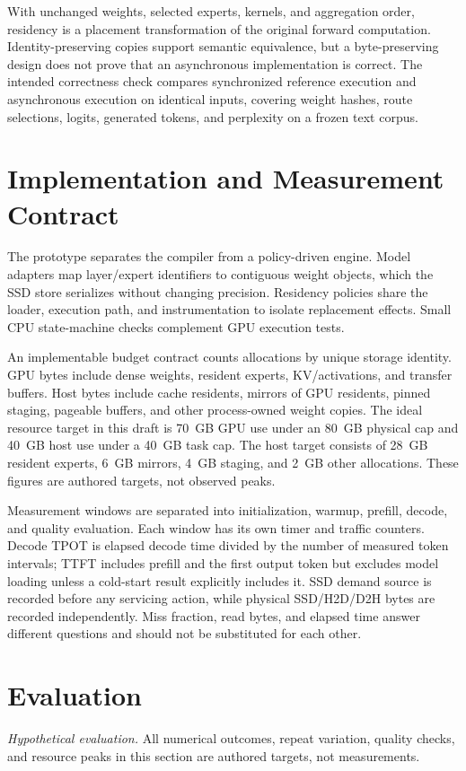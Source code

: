 \documentclass[conference,9pt,letterpaper]{IEEEtran}
\newcommand{\scenario}{\textit{Hypothetical evaluation.}}
\begin{document}
With unchanged weights, selected experts, kernels, and aggregation order, residency is a placement transformation of the original forward computation. Identity-preserving copies support semantic equivalence, but a byte-preserving design does not prove that an asynchronous implementation is correct. The intended correctness check compares synchronized reference execution and asynchronous execution on identical inputs, covering weight hashes, route selections, logits, generated tokens, and perplexity on a frozen text corpus.

\section{Implementation and Measurement Contract}
The prototype separates the compiler from a policy-driven engine. Model adapters map layer/expert identifiers to contiguous weight objects, which the SSD store serializes without changing precision. Residency policies share the loader, execution path, and instrumentation to isolate replacement effects. Small CPU state-machine checks complement GPU execution tests.

An implementable budget contract counts allocations by unique storage identity. GPU bytes include dense weights, resident experts, KV/activations, and transfer buffers. Host bytes include cache residents, mirrors of GPU residents, pinned staging, pageable buffers, and other process-owned weight copies. The ideal resource target in this draft is 70~GB GPU use under an 80~GB physical cap and 40~GB host use under a 40~GB task cap. The host target consists of 28~GB resident experts, 6~GB mirrors, 4~GB staging, and 2~GB other allocations. These figures are authored targets, not observed peaks.

Measurement windows are separated into initialization, warmup, prefill, decode, and quality evaluation. Each window has its own timer and traffic counters. Decode TPOT is elapsed decode time divided by the number of measured token intervals; TTFT includes prefill and the first output token but excludes model loading unless a cold-start result explicitly includes it. SSD demand source is recorded before any servicing action, while physical SSD/H2D/D2H bytes are recorded independently. Miss fraction, read bytes, and elapsed time answer different questions and should not be substituted for each other.

\section{Evaluation}
\scenario{} All numerical outcomes, repeat variation, quality checks, and resource peaks in this section are authored targets, not measurements.
\end{document}
